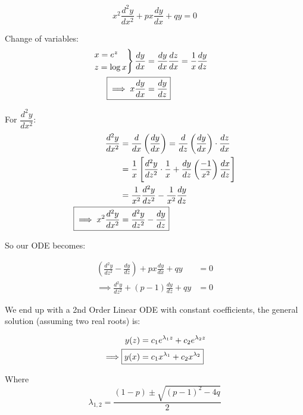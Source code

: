 \documentclass[twoside]{scrartcl}
\begin{document}
  \pagebreak
  
  
  
\[x^2\frac{d^2y}{dx^2} + px\frac{dy}{dx} + qy = 0\]

Change of variables: 
\[\begin{aligned}
\begin{rcases*}
x = e^z\\
z = \log x	
\end{rcases*}
\frac{dy}{dx} &= \frac{dy}{dx}\frac{dz}{dx} = \frac{1}{x}\frac{dy}{dz}\\
\Aboxed{\implies x\frac{dy}{dx} &= \frac{dy}{dz}}
\end{aligned}\]


For $\dfrac{d^2y}{dx^2}$: 
\[
\begin{aligned}
  \frac{d^2y}{dx^2} &= \frac{d}{dx}\left(\frac{dy}{dx}\right) = \frac{d}{dz}\left(\frac{dy}{dx}\right)\cdot\frac{dz}{dx}\\
  &= \frac{1}{x}\left[\frac{d^2y}{dz^2}\cdot\frac{1}{x} + \frac{dy}{dz}\left(\frac{-1}{x^2}\right)\frac{dx}{dz}\right]\\
  &= \frac{1}{x^2}\frac{d^2y}{dz^2} - \frac{1}{x^2}\frac{dy}{dz}\\
  \Aboxed{\implies x^2\frac{d^2y}{dx^2} &= \frac{d^2y}{dz^2} - \frac{dy}{dz}}
\end{aligned}
\]

So our ODE becomes:

\[
\begin{aligned}
  \left(\frac{d^2y}{dz^2} - \frac{dy}{dz}\right) + px\frac{dy}{dx} + qy &= 0\\
 \implies \frac{d^2y}{dz^2} + (p-1)\frac{dy}{dz} + qy &= 0
\end{aligned}
\]

We end up with a 2nd Order Linear ODE with constant coefficients, the general solution (assuming two real roots) is: 

\[
\begin{aligned}
  y(z) &= c_1e^{\lambda_1z} + c_2e^{\lambda_2z}\\
\implies  \Aboxed{y(x) &= c_1x^{\lambda_1} + c_2x^{\lambda_2} }
\end{aligned}
\]

Where \[\lambda_{1,2} = \frac{(1-p) \pm \sqrt{(p-1)^2 - 4q}}{2}\]
\end{document}
